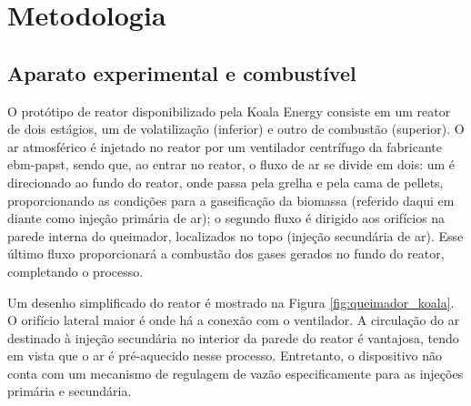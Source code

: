 \chapter{Metodologia}

\section{Aparato experimental e combustível}
O protótipo de reator disponibilizado pela Koala Energy consiste em um reator de dois estágios, um de volatilização (inferior) e outro de combustão (superior). O ar atmosférico é injetado no reator por um ventilador centrífugo da fabricante ebm-papst, sendo que, ao entrar no reator, o fluxo de ar se divide em dois: um é direcionado ao fundo do reator, onde passa pela grelha e pela cama de pellets, proporcionando as condições para a gaseificação da biomassa (referido daqui em diante como injeção primária de ar); o segundo fluxo é dirigido aos orifícios na parede interna do queimador, localizados no topo (injeção secundária de ar). Esse último fluxo proporcionará a combustão dos gases gerados no fundo do reator, completando o processo.

Um desenho simplificado do reator é mostrado na Figura \ref{fig:queimador_koala}. O orifício lateral maior é onde há a conexão com o ventilador. A circulação do ar destinado à injeção secundária no interior da parede do reator é vantajosa, tendo em vista que o ar é pré-aquecido nesse processo. Entretanto, o dispositivo não conta com um mecanismo de regulagem de vazão especificamente para as injeções primária e secundária. 

